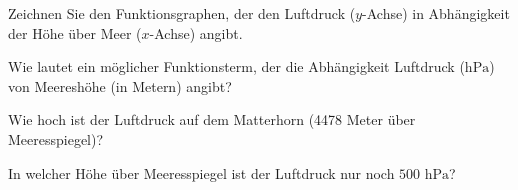 \begin{bbwAufgabenBlock}

\item Zeichnen Sie den Funktionsgraphen, der den Luftdruck ($y$-Achse)
  in Abhängigkeit der Höhe über Meer ($x$-Achse) angibt.


\item Wie lautet ein möglicher Funktionsterm, der die Abhängigkeit
  Luftdruck ($\textrm{hPa}$) von Meereshöhe (in Metern) angibt?



\item Wie hoch ist der Luftdruck auf dem Matterhorn (4478 Meter über
  Meeresspiegel)?


\item In welcher Höhe über Meeresspiegel ist der Luftdruck nur noch
  $500 \textrm{ hPa}$?

  
\end{bbwAufgabenBlock}
\platzFuerBerechnungenBisEndeSeite{}


\newpage
